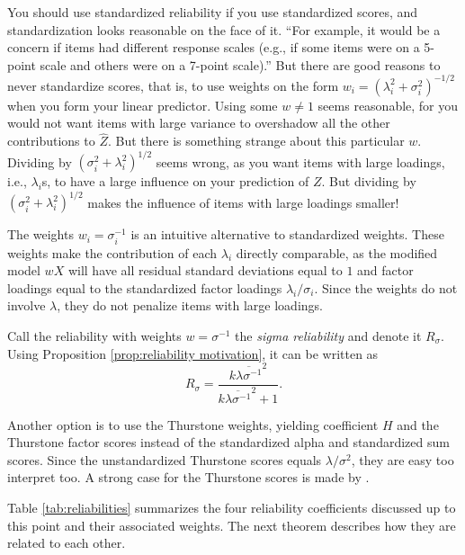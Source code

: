 \documentclass[twoside]{article}
\begin{document}
You should use standardized reliability if you use standardized scores, and standardization looks reasonable on the face of it. \enquote{For example, it would be a concern if items had different response scales (e.g., if some items were on a 5-point scale and others were on a 7-point scale).} \citep[p. 139]{Furr2013-yu} But there are good reasons to never standardize scores, that is, to use weights on the form $w_{i}=(\lambda_{i}^{2}+\sigma_{i}^{2})^{-1/2}$ when you form your linear predictor.
Using some $w\ne1$ seems reasonable, for you would not want items
with large variance to overshadow all the other contributions to $\hat{Z}$.
But there is something strange about this particular $w$. Dividing by $(\sigma_{i}^{2}+\lambda_{i}^{2})^{1/2}$
seems wrong, as you want items with large loadings, i.e., $\lambda_{i}$s, to have a large
influence on your prediction of $Z$. But dividing by $(\sigma_{i}^{2}+\lambda_{i}^{2})^{1/2}$
makes the influence of items with large loadings smaller!

The weights $w_i=\sigma_{i}^{-1}$ is an intuitive alternative to standardized weights. These weights make the contribution of each $\lambda_i$ directly comparable, as the modified model $wX$ will have all residual standard deviations equal to $1$ and factor loadings equal to the standardized factor loadings $\lambda_i/\sigma_i$. Since the weights do not involve $\lambda$, they do not penalize items with large loadings. 

Call the reliability with weights $w=\sigma^{-1}$ the \textit{sigma reliability} and denote it $ R_\sigma$. Using Proposition \ref{prop:reliability motivation}, it can be written as
\begin{equation}
 R_\sigma=\frac{k\overline{\lambda\sigma^{-1}}^{2}}{k\overline{\lambda\sigma^{-1}}^{2}+1}.\label{eq:Sigma-standardized reliability}
\end{equation}

Another option is to use the Thurstone weights, yielding coefficient $H$ and the Thurstone factor scores instead of the standardized alpha and standardized sum scores. Since the unstandardized Thurstone scores equals $\lambda/\sigma^2$, they are easy too interpret too. A strong case for the Thurstone scores is made by \citet{McNeish2019-ea}.

Table \ref{tab:reliabilities} summarizes the four reliability coefficients discussed up to this point and their associated weights. The next theorem describes how they are related to each other. 
\end{document}

